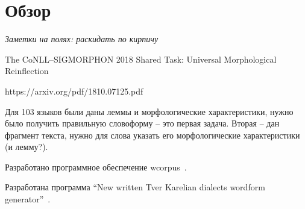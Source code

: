\chapter{Обзор} \label{chapt_review}



\emph{Заметки на полях: раскидать по кирпичу}

The CoNLL--SIGMORPHON 2018   Shared Task: Universal Morphological Reinflection

https://arxiv.org/pdf/1810.07125.pdf

Для 103 языков были даны леммы и морфологические характеристики, 
нужно было получить правильную словоформу -- это первая задача. 
Вторая -- дан фрагмент текста, нужно для слова указать его морфологические 
характеристики (и лемму?).

Разработано программное обеспечение wcorpus~\cite{vakbib_soft_wcorpus}.

Разработана программа ``New written Tver Karelian dialects wordform generator''~\cite{vakbib_soft_Tver_generator}.


 
%
 
%
 
%

%

%
 

 




